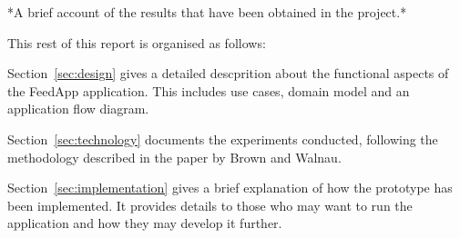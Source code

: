 \noindent
 *A brief account of the results that have been obtained in the project.*
\medskip

\noindent
This rest of this report is organised as follows:

\smallskip

\noindent
Section~\ref{sec:design} gives a detailed descprition about the functional aspects of the FeedApp application. This includes use cases, domain model and an application flow diagram.
\smallskip

\noindent
Section~\ref{sec:technology} documents the experiments conducted, following the methodology described in the paper by Brown and Walnau.
\smallskip

\noindent
Section~\ref{sec:implementation} gives a brief explanation of how the prototype has been implemented. It provides details to those who may want to run the application and how they may develop it further.